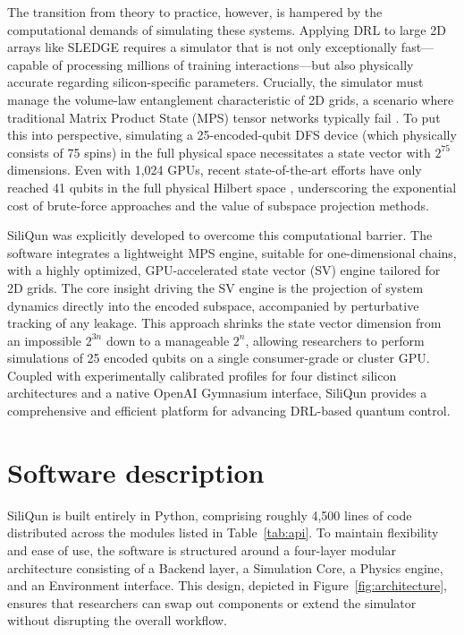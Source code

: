 \documentclass[preprint,12pt, a4paper]{elsarticle}
\begin{document}
The transition from theory to practice, however, is hampered by the computational demands of simulating these systems. Applying DRL to large 2D arrays like SLEDGE requires a simulator that is not only exceptionally fast---capable of processing millions of training interactions---but also physically accurate regarding silicon-specific parameters. Crucially, the simulator must manage the volume-law entanglement characteristic of 2D grids, a scenario where traditional Matrix Product State (MPS) tensor networks typically fail \cite{schollwock2011density}. To put this into perspective, simulating a 25-encoded-qubit DFS device (which physically consists of 75 spins) in the full physical space necessitates a state vector with $2^{75}$ dimensions. Even with 1,024 GPUs, recent state-of-the-art efforts have only reached 41 qubits in the full physical Hilbert space \cite{hiraoka2026chemqulacs}, underscoring the exponential cost of brute-force approaches and the value of subspace projection methods.

SiliQun was explicitly developed to overcome this computational barrier. The software integrates a lightweight MPS engine, suitable for one-dimensional chains, with a highly optimized, GPU-accelerated state vector (SV) engine tailored for 2D grids. The core insight driving the SV engine is the projection of system dynamics directly into the encoded subspace, accompanied by perturbative tracking of any leakage. This approach shrinks the state vector dimension from an impossible $2^{3n}$ down to a manageable $2^n$, allowing researchers to perform simulations of 25 encoded qubits on a single consumer-grade or cluster GPU. Coupled with experimentally calibrated profiles for four distinct silicon architectures and a native OpenAI Gymnasium \cite{gymnasium2023} interface, SiliQun provides a comprehensive and efficient platform for advancing DRL-based quantum control.

\section{Software description}
\label{sec:description}

SiliQun is built entirely in Python, comprising roughly 4,500 lines of code distributed across the modules listed in Table~\ref{tab:api}. To maintain flexibility and ease of use, the software is structured around a four-layer modular architecture consisting of a Backend layer, a Simulation Core, a Physics engine, and an Environment interface. This design, depicted in Figure~\ref{fig:architecture}, ensures that researchers can swap out components or extend the simulator without disrupting the overall workflow.
\end{document}
